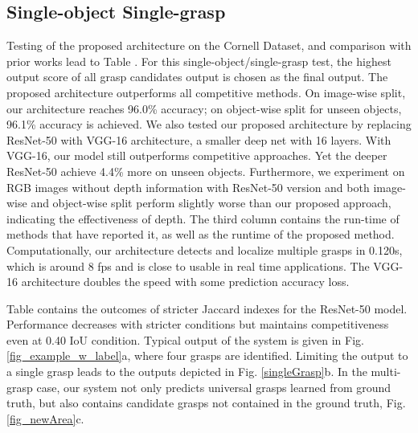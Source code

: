 \documentclass[letterpaper, 10 pt, journal, twoside]{IEEEtran}
\begin{document}
\subsection{Single-object Single-grasp}
Testing of the proposed architecture on the Cornell Dataset, and
comparison with prior works lead to Table .  
For this single-object/single-grasp test, the highest output score of
all grasp candidates output is chosen as the final output.
The proposed architecture outperforms all competitive methods. On image-wise
split, our architecture reaches 96.0\% accuracy; on object-wise split for
unseen objects, 96.1\% accuracy is achieved.  
We also tested our proposed architecture by replacing ResNet-50 with VGG-16
architecture, a smaller deep net with 16 layers. With VGG-16, our model
still outperforms competitive approaches. Yet the deeper ResNet-50 achieve
4.4\% more on unseen objects.
Furthermore, we experiment on RGB images without depth information with ResNet-50 version and both image-wise and object-wise split perform slightly worse than our proposed approach, indicating the effectiveness of depth.
The third column contains the run-time of methods that have reported it, as
well as the runtime of the proposed method.  Computationally, our
architecture detects and localize multiple grasps in 0.120s, which is around
8 fps and is close to usable in real time applications.  The VGG-16
architecture doubles the speed with some prediction accuracy loss.

Table  contains the outcomes of stricter Jaccard indexes for
the ResNet-50 model. Performance decreases with stricter conditions but maintains competitiveness even at 0.40 IoU condition.
Typical output of the system is given in Fig. \ref{fig_example_w_label}a,
where four grasps are identified.  Limiting the output to a single grasp
leads to the outputs depicted in Fig.  \ref{singleGrasp}b. 
In the multi-grasp case, our system not only predicts universal grasps
learned from ground truth, but also contains candidate grasps not contained 
in the ground truth, Fig. \ref{fig_newArea}c.
\end{document}
